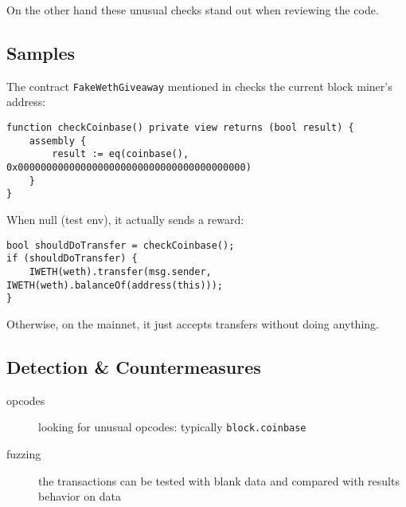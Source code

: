 On the other hand these unusual checks stand out when reviewing the code.

\subsection{Samples}

The contract \lstinline{FakeWethGiveaway} mentioned in \cite{article-red-pill} checks the current block miner’s address:

\begin{lstlisting}[language=Solidity]
function checkCoinbase() private view returns (bool result) {
    assembly {
        result := eq(coinbase(), 0x0000000000000000000000000000000000000000)
    }
}
\end{lstlisting}

When null (test env), it actually sends a reward:

\begin{lstlisting}[language=Solidity]
bool shouldDoTransfer = checkCoinbase();
if (shouldDoTransfer) {
    IWETH(weth).transfer(msg.sender, IWETH(weth).balanceOf(address(this)));
}
\end{lstlisting}

Otherwise, on the mainnet, it just accepts transfers without doing anything.

\subsection{Detection \& Countermeasures}

\begin{description}
\item[opcodes]{looking for unusual opcodes: typically \lstinline[language=Solidity]{block.coinbase}}
\item[fuzzing]{the transactions can be tested with blank data and compared with results behavior on data}
\end{description}
